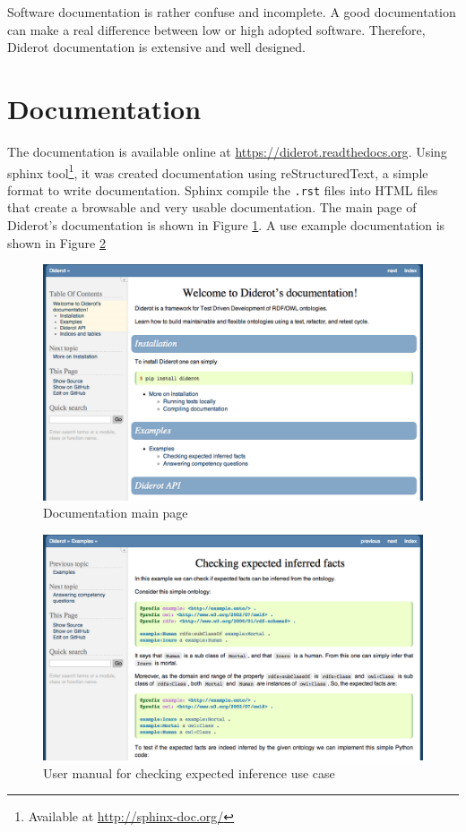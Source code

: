 \documentclass{report}
\begin{document}
Software documentation is rather confuse and incomplete.
A good documentation can make a real difference between low or high adopted software.
Therefore, Diderot documentation is extensive and well designed.

\section{Documentation}

The documentation is available online at \url{https://diderot.readthedocs.org}.
Using sphinx tool\footnote{Available at \url{http://sphinx-doc.org/}}, it was created documentation using
reStructuredText, a simple format to write documentation.
Sphinx compile the \texttt{.rst} files into HTML files that create a browsable and very usable documentation.
The main page of Diderot's documentation is shown in Figure \ref{figDocs}.
A use example documentation is shown in Figure \ref{figDocs2}

\begin{figure}[!hbt]
    \centering
    \label{figDocs}
    \caption{Documentation main page}
    \includegraphics[scale=0.4]{fig/documentation.png}
\end{figure}

\begin{figure}[!hbt]
    \centering
    \label{figDocs2}
    \caption{User manual for checking expected inference use case}
    \includegraphics[scale=0.4]{fig/documentation2.png}
\end{figure}
\end{document}
